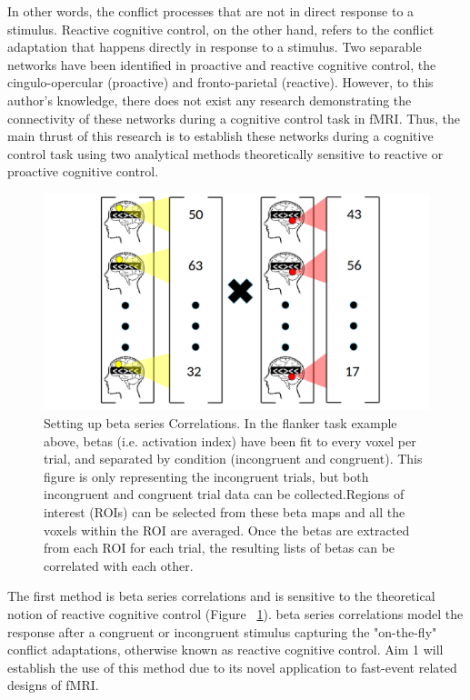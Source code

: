 \documentclass[phd,appendix,figures]{uithesis}
\begin{document}
In other words, the conflict processes that are not in direct response to a stimulus.
Reactive cognitive control, on the other hand, refers to the conflict adaptation that happens directly in response to a stimulus.
Two separable networks have been identified in proactive and reactive cognitive control, the cingulo-opercular (proactive) and fronto-parietal (reactive).
However, to this author's knowledge, there does not exist any research demonstrating the connectivity of these networks during a cognitive control task in fMRI.
Thus, the main thrust of this research is to establish these networks during a cognitive control task using two analytical methods theoretically sensitive to reactive or proactive cognitive control.

\begin{figure}[H]%
    \centering
    \includegraphics[scale=0.25]{betaseries_correlation_illustration}
    \caption{Setting up beta series Correlations. In the flanker task example above, betas (i.e. activation index) have been fit to every voxel per trial, and separated by condition (incongruent and congruent). This figure is only representing the incongruent trials, but both incongruent and congruent trial data can be collected.Regions of interest (ROIs) can be selected from these beta maps and all the voxels within the ROI are averaged. Once the betas are extracted from each ROI for each trial, the resulting lists of betas can be correlated with each other.}%
    \label{fig:betaseries_correlation_illustration}%
\end{figure}

The first method is beta series correlations and is sensitive to the theoretical notion of reactive cognitive control (Figure ~\ref{fig:betaseries_correlation_illustration}). 
beta series correlations model the response after a congruent or incongruent stimulus capturing the "on-the-fly" conflict adaptations, otherwise known as reactive cognitive control.
Aim 1 will establish the use of this method due to its novel application to fast-event related designs of fMRI.
\end{document}

